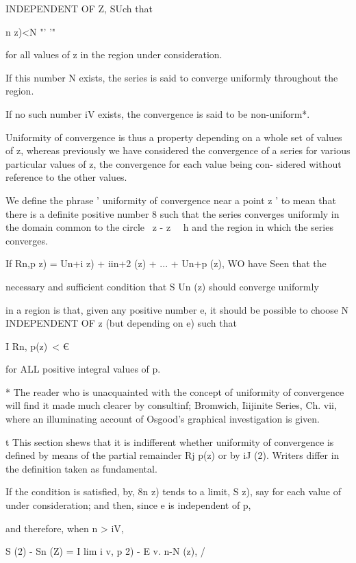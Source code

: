 INDEPENDENT OF Z, SUch that

n z)<N "' '"

for all values of z in the region under consideration.

If this number N exists, the series is said to converge uniformly
throughout the region.

If no such number iV exists, the convergence is said to be
non-uniform*.

Uniformity of convergence is thus a property depending on a whole set
of values of z, whereas previously we have considered the convergence
of a series for various particular values of z, the convergence for
each value being con- sidered without reference to the other values.

We define the phrase ' uniformity of convergence near a point z ' to
mean that there is a definite positive number 8 such that the series
converges uniformly in the domain common to the circle \ z - z \ \ h
and the region in which the series converges.


If Rn,p z) = Un+i z) + iin+2 (z) + ... + Un+p (z), WO have Seen that
the

necessary and sufficient condition that S Un (z) should converge
uniformly

in a region is that, given any positive number e, it should be
possible to choose N INDEPENDENT OF z (but depending on e) such that

I Rn, p(z)\ < €

for ALL positive integral values of p.

* The reader who is unacquainted with the concept of uniformity of
convergence will find it made much clearer by consultinf; Bromwich,
Iiijinite Series, Ch. vii, where an illuminating account of Osgood's
graphical investigation is given.

t This section shews that it is indifferent whether uniformity of
convergence is defined by means of the partial remainder Rj p(z) or by
iJ (2). Writers differ in the definition taken as fundamental.

%
%

If the condition is satisfied, by, 8n z) tends to a limit, S
z), say for each value of under consideration; and then, since e is
independent of p,

and therefore, when n > iV,

S (2) - Sn (Z) = I lim i v, p 2) - E v. n-N (z), /

